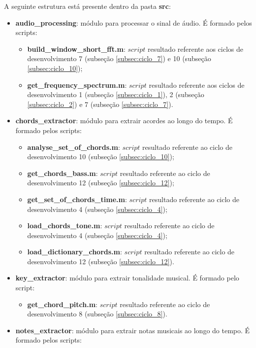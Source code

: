 A seguinte estrutura está presente dentro da pasta \textbf{src}:
\begin{itemize}
	\item \textbf{audio\_processing}: módulo para processar o sinal de áudio. É formado pelos scripts:
		\begin{itemize}
			\item \textbf{build\_window\_short\_fft.m}: $script$ resultado referente aos ciclos de desenvolvimento 7 (subseção \ref{subsec:ciclo_7}) e 10 (subseção \ref{subsec:ciclo_10});  
			\item \textbf{get\_frequency\_spectrum.m}: $script$ resultado referente aos ciclos de desenvolvimento 1 (subseção \ref{subsec:ciclo_1}), 2 (subseção \ref{subsec:ciclo_2}) e 7 (subseção \ref{subsec:ciclo_7}).
		\end{itemize}		
	\item \textbf{chords\_extractor}: módulo para extrair acordes ao longo do tempo. É formado pelos scripts:
		\begin{itemize}
			\item \textbf{analyse\_set\_of\_chords.m}: $script$ resultado referente ao ciclo de desenvolvimento 10 (subseção \ref{subsec:ciclo_10});
			\item \textbf{get\_chords\_bass.m}: $script$ resultado referente ao ciclo de desenvolvimento 12 (subseção \ref{subsec:ciclo_12});
			\item \textbf{get\_set\_of\_chords\_time.m}: $script$ resultado referente ao ciclo de desenvolvimento 4 (subseção \ref{subsec:ciclo_4});
			\item \textbf{load\_chords\_tone.m}: $script$ resultado referente ao ciclo de desenvolvimento 4 (subseção \ref{subsec:ciclo_4});
			\item \textbf{load\_dictionary\_chords.m}: $script$ resultado referente ao ciclo de desenvolvimento 12 (subseção \ref{subsec:ciclo_12}).
		\end{itemize}
	\item \textbf{key\_extractor}: módulo para extrair tonalidade musical. É formado pelo script:
		\begin{itemize}
			\item \textbf{get\_chord\_pitch.m}: $script$ resultado referente ao ciclo de desenvolvimento 8 (subseção \ref{subsec:ciclo_8}).
		\end{itemize}
	\item \textbf{notes\_extractor}: módulo para extrair notas musicais ao longo do tempo. É formado pelos scripts:
		\begin{itemize}

\end{itemize}
\end{itemize}
